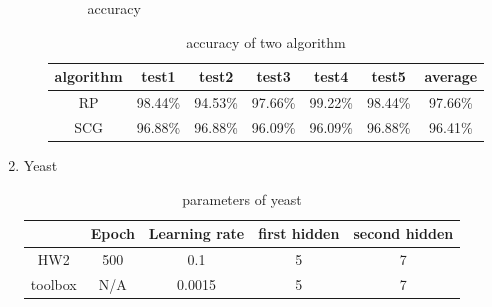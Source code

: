\documentclass[12pt,a4paper]{article}
\begin{document}
\begin{CJK}{UTF8}{bsmi}
\begin{enumerate}
\begin{enumerate}
\begin{figure}[H]
\begin{subfigure}{.5\textwidth}
	 		\end{subfigure}
	 		\caption{accuracy}
	 		
	 	\end{figure}
	 	
	 	\begin{table}[H]
	 		\caption{accuracy of two algorithm} %
	 		\centering %
	 		\begin{tabular}{c c c c c c c} %
	 			\hline\hline %
	 			algorithm & test1 & test2 & test3 & test4 &test5 & average\\ [0.5ex] %
	 			\hline %
	 			RP & 98.44\% & 94.53\% & 97.66\% & 99.22\% &98.44\% &97.66\%\\ %
	 			
	 			SCG & 96.88\% & 96.88\% & 96.09\% & 96.09\% &96.88\% &96.41\%\\
	 			[0.5ex] %
	 			\hline %
	 		\end{tabular}
	 	\end{table}

	 \end{enumerate}
	 \newpage
	 
	 \item Yeast
	 
	  \begin{enumerate}
	 	\begin{table}[H]
	 		\caption{parameters of yeast} %
	 		\centering %
	 		\begin{tabular}{c c c c c} %
	 			\hline\hline %
	 			& Epoch & Learning rate & first hidden & second hidden \\ [0.5ex] %
	 			\hline %
	 			HW2 & 500 & 0.1 & 5 & 7\\ %
	 			toolbox & N/A & 0.0015 & 5 & 7\\
	 			[0.5ex] %
	 			\hline %
	 		\end{tabular}
	 		\label{table:nonlin} %
	 	\end{table}


\end{enumerate}
\end{enumerate}
\end{CJK}
\end{document}
